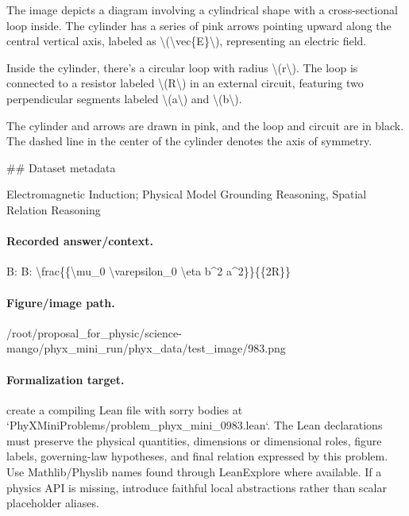 The image depicts a diagram involving a cylindrical shape with a cross-sectional loop inside. The cylinder has a series of pink arrows pointing upward along the central vertical axis, labeled as \textbackslash{}(\textbackslash{}vec\{E\}\textbackslash{}), representing an electric field.

Inside the cylinder, there's a circular loop with radius \textbackslash{}(r\textbackslash{}). The loop is connected to a resistor labeled \textbackslash{}(R\textbackslash{}) in an external circuit, featuring two perpendicular segments labeled \textbackslash{}(a\textbackslash{}) and \textbackslash{}(b\textbackslash{}).

The cylinder and arrows are drawn in pink, and the loop and circuit are in black. The dashed line in the center of the cylinder denotes the axis of symmetry.

\#\# Dataset metadata

Electromagnetic Induction; Physical Model Grounding Reasoning, Spatial Relation Reasoning

\paragraph{Recorded answer/context.}
B: B: \textbackslash{}frac\{\{\textbackslash{}mu\_0 \textbackslash{}varepsilon\_0 \textbackslash{}eta b\textasciicircum{}2 a\textasciicircum{}2\}\}\{\{2R\}\}

\paragraph{Figure/image path.}
/root/proposal\_for\_physic/science-mango/phyx\_mini\_run/phyx\_data/test\_image/983.png

\paragraph{Formalization target.}
create a compiling Lean file with sorry bodies at `PhyXMiniProblems/problem\_phyx\_mini\_0983.lean`. The Lean declarations must preserve the physical quantities, dimensions or dimensional roles, figure labels, governing-law hypotheses, and final relation expressed by this problem.
Use Mathlib/Physlib names found through LeanExplore where available. If a physics API is missing, introduce faithful local abstractions rather than scalar placeholder aliases.

